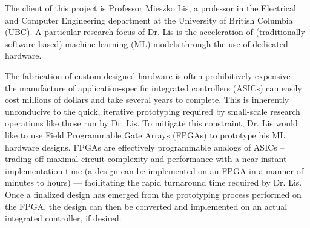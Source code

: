The client of this project is Professor Mieszko Lis, a professor in the Electrical and Computer Engineering department at the University of British Columbia (UBC). A particular research focus of Dr. Lis is the acceleration of (traditionally software-based) machine-learning (ML) models through the use of dedicated hardware. 

The fabrication of custom-designed hardware is often prohibitively expensive --- the manufacture of application-specific integrated controllers (ASICs) can easily cost millions of dollars and take several years to complete. This is inherently unconducive to the quick, iterative prototyping required by small-scale research operations like those run by Dr. Lis. To mitigate this constraint, Dr. Lis would like to use Field Programmable Gate Arrays (FPGAs) to prototype his ML hardware designs. FPGAs are effectively programmable analogs of ASICs -- trading off maximal circuit complexity and performance with a near-instant implementation time (a design can be implemented on an FPGA in a manner of minutes to hours) --- facilitating the rapid turnaround time required by Dr. Lis. Once a finalized design has emerged from the prototyping process performed on the FPGA, the design can then be converted and implemented on an actual integrated controller, if desired.